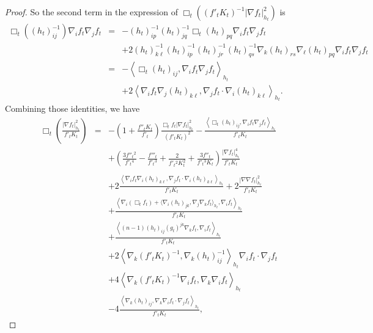\documentclass{amsart}
\theoremstyle{definition}
\theoremstyle{remark}
\numberwithin{equation}{section}
\begin{document}
\begin{proof}
So the second term in the expression of $\Box_{t}((f'_{t}K_{t})^{-1}
|\nabla f_{t}|^{2}_{h_{t}})$ is
\begin{eqnarray*}
\Box_{t}((h_{t})^{-1}_{ij})\nabla_{i}f_{t}\nabla_{j}f_{t}
&=&-(h_{t})^{-1}_{ip}(h_{t})^{-1}_{jq}\Box_{t} (h_{t})_{pq}\nabla_{i}f_{t}\nabla_{j}f_{t}\\
&&+2(h_{t})^{-1}_{k\ell}(h_{t})^{-1}_{ip}(h_{t})^{-1}_{jr}(h_{t})^{-1}_{qs}
\nabla_{k}(h_{t})_{rs}\nabla_{\ell}(h_{t})_{pq}\nabla_{i}f_{t}\nabla_{j}f_{t}\\
&=&-\left\langle\Box_{t} (h_{t})_{ij},\nabla_{i}f_{t}\nabla_{j}f_{t}
\right\rangle_{h_{t}}\\
&&+2\left\langle\nabla_{i}f_{t}\nabla_{j}(h_{t})_{k\ell},\nabla_{j}f_{t}
\cdot\nabla_{i}(h_{t})_{k\ell}\right\rangle_{h_{t}}.
\end{eqnarray*}
Combining those identities, we have
\begin{eqnarray*}
\Box_{t}\left(\frac{|\nabla f_{t}|^{2}_{h_{t}}}{f'_{t}K_{t}}\right)
&=&-\left(1+\frac{f''_{t}K_{t}}{f'_{t}}\right)\frac{\Box_{t} f_{t}|\nabla f_{t}|^{2}_{h_{t}}}{(f'_{t}K_{t})^{2}}-\frac{\left\langle\Box_{t} (h_{t})_{ij},\nabla_{i}f_{t}\nabla_{j}f_{t}
\right\rangle_{h_{t}}}{f'_{t}K_{t}}
\\
&&+\left(\frac{3f''_{t}{}^{2}}{f'_{t}{}^{4}}-\frac{f'''_{t}}{f'_{t}{}^{3}}
+\frac{2}{f'_{t}{}^{2}K^{2}_{t}}
+\frac{3f''_{t}}{f'_{t}{}^{3}K_{t}}\right)\frac{|\nabla f_{t}|^{4}_{h_{t}}}{f'_{t}K_{t}}\\
&&\\
&&+2\frac{\left\langle\nabla_{i}f_{t}\nabla_{i}(h_{t})_{k\ell},
\nabla_{j}f_{t}\cdot\nabla_{i}(h_{t})_{k\ell}\right\rangle_{h_{t}}}{f'_{t}K_{t}}+2\frac{|\nabla\nabla f_{t}|^{2}_{h_{t}}}{f'_{t}K_{t}}\\
&&+\frac{\left\langle\nabla_{i}(\Box_{t} f_{t})+\langle\nabla_{i}(h_{t})_{jk},\nabla_{j}\nabla_{k}f_{t}\rangle_{h_{t}},\nabla_{i}f_{t}
\right\rangle_{h_{t}}}{f'_{t}K_{t}}\\
&&+\frac{\left\langle
(n-1)(h_{t})_{ij}(g_{t})^{jk}\nabla_{k}f_{t},\nabla_{i}f_{t}\right
\rangle_{h_{t}}}{f'_{t}K_{t}}\\
&&+2\left\langle\nabla_{k}(f'_{t}K_{t})^{-1},
\nabla_{k}(h_{t})^{-1}_{ij}\right\rangle_{h_{t}}\nabla_{i}f_{t}
\cdot\nabla_{j}f_{t}\\
&&+4\left\langle\nabla_{k}(f'_{t}K_{t})^{-1}\nabla_{i}f_{t},
\nabla_{k}\nabla_{i}f_{t}\right\rangle_{h_{t}}\\
&&-4\frac{\left\langle\nabla_{k}(h_{t})_{ij},\nabla_{k}\nabla_{i}f_{t}
\cdot\nabla_{j}f_{t}\right\rangle_{h_{t}}}{f'_{t}K_{t}},

\end{eqnarray*}
\end{proof}
\end{document}
